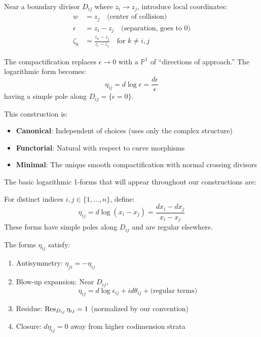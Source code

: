 \begin{proposition}\label{prop:local-charts}
Near a boundary divisor $D_{ij}$ where $z_i \to z_j$, introduce local coordinates:
\begin{align}
w &= z_j \quad \text{(center of collision)} \\
\epsilon &= z_i - z_j \quad \text{(separation, goes to 0)} \\
\zeta_k &= \frac{z_k - z_j}{z_i - z_j} \quad \text{for } k \neq i,j
\end{align}

The compactification replaces $\epsilon \to 0$ with a $\mathbb{P}^1$ of ``directions of approach.''
The logarithmic form becomes:
$$\eta_{ij} = d\log \epsilon = \frac{d\epsilon}{\epsilon}$$
having a simple pole along $D_{ij} = \{\epsilon = 0\}$.

This construction is:
\begin{itemize}
\item \textbf{Canonical}: Independent of choices (uses only the complex structure)
\item \textbf{Functorial}: Natural with respect to curve morphisms
\item \textbf{Minimal}: The unique smooth compactification with normal crossing divisors
\end{itemize}
\end{proposition}
 
The basic logarithmic 1-forms that will appear throughout our constructions are:
 
\begin{definition}
For distinct indices $i, j \in \{1, \ldots, n\}$, define:
\[
\eta_{ij} = d\log(x_i - x_j) = \frac{dx_i - dx_j}{x_i - x_j}
\]
These forms have simple poles along $D_{ij}$ and are regular elsewhere.
\end{definition}
 
\begin{proposition}\label{prop:eta}
The forms $\eta_{ij}$ satisfy:
\begin{enumerate}
\item Antisymmetry: $\eta_{ji} = -\eta_{ij}$
\item Blow-up expansion: Near $D_{ij}$,
\[
\eta_{ij} = d\log \epsilon_{ij} + id\theta_{ij} + \text{(regular terms)}
\]
\item Residue: $\operatorname{Res}_{D_{ij}} \eta_{ij} = 1$ (normalized by our convention)
\item Closure: $d\eta_{ij} = 0$ away from higher codimension strata
\end{enumerate}
\end{proposition}
 
